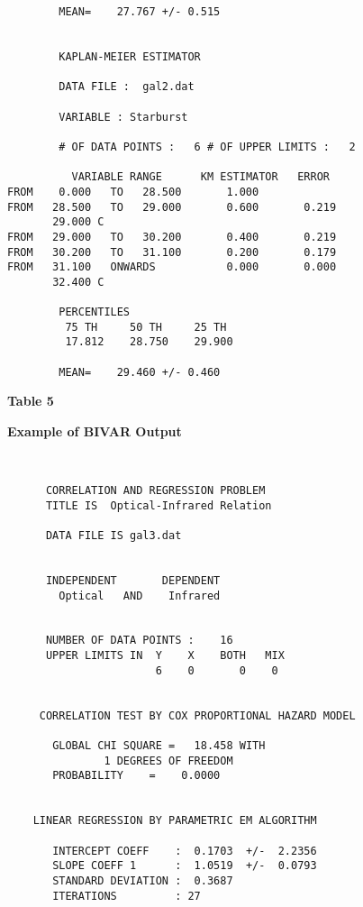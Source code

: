 \begin{small}
\begin{verbatim}
        MEAN=    27.767 +/- 0.515
    
    
        KAPLAN-MEIER ESTIMATOR
    
        DATA FILE :  gal2.dat
    
        VARIABLE : Starburst
    
        # OF DATA POINTS :   6 # OF UPPER LIMITS :   2
    
          VARIABLE RANGE      KM ESTIMATOR   ERROR
FROM    0.000   TO   28.500       1.000
FROM   28.500   TO   29.000       0.600       0.219
       29.000 C 
FROM   29.000   TO   30.200       0.400       0.219
FROM   30.200   TO   31.100       0.200       0.179
FROM   31.100   ONWARDS           0.000       0.000
       32.400 C 
    
        PERCENTILES    
         75 TH     50 TH     25 TH
         17.812    28.750    29.900
    
        MEAN=    29.460 +/- 0.460
\end{verbatim}
\end{small}
\newpage


\centerline{\Large\bf Table 5}

\bigskip 
\bigskip 

\centerline{\large\bf Example of BIVAR Output}

\bigskip

\begin{center}
\begin{verbatim}

     
      CORRELATION AND REGRESSION PROBLEM
      TITLE IS  Optical-Infrared Relation                                                       
     
      DATA FILE IS gal3.dat 
     
     
      INDEPENDENT       DEPENDENT
        Optical   AND    Infrared
     
     
      NUMBER OF DATA POINTS :    16
      UPPER LIMITS IN  Y    X    BOTH   MIX
                       6    0       0    0
     
    
     CORRELATION TEST BY COX PROPORTIONAL HAZARD MODEL
    
       GLOBAL CHI SQUARE =   18.458 WITH 
               1 DEGREES OF FREEDOM
       PROBABILITY    =    0.0000
    
          
    LINEAR REGRESSION BY PARAMETRIC EM ALGORITHM
          
       INTERCEPT COEFF    :  0.1703  +/-  2.2356
       SLOPE COEFF 1      :  1.0519  +/-  0.0793
       STANDARD DEVIATION :  0.3687
       ITERATIONS         : 27
          


\end{verbatim}
\end{center}
 
